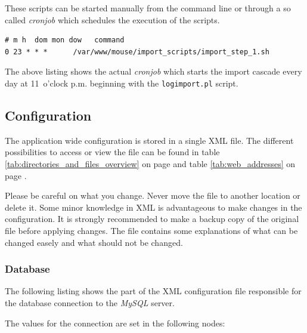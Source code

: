 \documentclass[a4paper,10pt,twoside,headings=small,bibliography=totocnumbered,headsepline]{scrartcl}
\begin{document}
\begin{appendix}
These scripts can be started manually from the command line or through a so called \textit{cronjob} which schedules the execution of the scripts.

\codefoot
\begin{lstlisting}[frame=none]
 # m h  dom mon dow   command
0 23 * * *      /var/www/mouse/import_scripts/import_step_1.sh   
\end{lstlisting}

The above listing shows the actual \textit{cronjob} which starts the import cascade every day at 11~o'clock p.m. beginning with the \lstinline|logimport.pl| script.

\newpage
\subsection{Configuration}
\label{app:config} 

The application wide configuration is stored in a single \ac{XML} file. The different possibilities to access or view the file can be found in table \ref{tab:directories_and_files_overview} on page \pageref{tab:directories_and_files_overview} and table \ref{tab:web_addresses} on page \pageref{tab:web_addresses}.

Please be careful on what you change. Never move the file to another location or delete it. Some minor knowledge in XML is advantageous to make changes in the configuration. It is strongly recommended to make a backup copy of the original file before applying changes. The file contains some explanations of what can be changed easely and what should not be changed.

\numcodestyle
\lstset{language=XML}    

\subsubsection{Database}
\label{app:configdb}

The following listing shows the part of the XML configuration file responsible for the database connection to the \textit{MySQL} server. 



The values for the connection are set in the following nodes:


\end{appendix}
\end{document}
